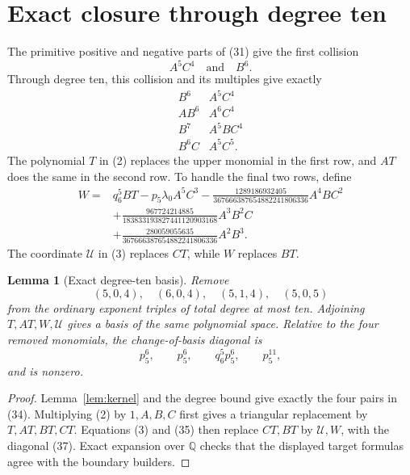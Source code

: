 \documentclass[11pt]{article}
\newtheorem{lemma}[theorem]{Lemma}
\theoremstyle{remark}
\newcommand{\cU}{\mathcal U}
\begin{document}
\section{Exact closure through degree ten}

The primitive positive and negative parts of (31) give the first
collision
\[
A^5C^4\quad\text{and}\quad B^6.
\tag{33}
\]
Through degree ten, this collision and its multiples give exactly
\[
\begin{array}{c|c}
B^6&A^5C^4\\
AB^6&A^6C^4\\
B^7&A^5BC^4\\
B^6C&A^5C^5.
\end{array}
\tag{34}
\]
The polynomial \(T\) in (2) replaces the upper monomial in the first
row, and \(AT\) does the same in the second row.  To handle the final
two rows, define
\[
\begin{aligned}
W={}&q_6^5BT-p_5\lambda_0A^5C^3
-\frac{1289186932405}{367666387654882241806336}A^4BC^2\\
&+\frac{967724214885}{183833193827441120903168}A^3B^2C\\
&+\frac{280059055635}{367666387654882241806336}A^2B^3.
\end{aligned}
\tag{35}
\]
The coordinate \(\cU\) in (3) replaces \(CT\), while \(W\) replaces
\(BT\).

\begin{lemma}[Exact degree-ten basis]
\label{lem:basis-ten}
Remove
\[
(5,0,4),\quad(6,0,4),\quad(5,1,4),\quad(5,0,5)
\tag{36}
\]
from the ordinary exponent triples of total degree at most ten.
Adjoining \(T,AT,W,\cU\) gives a basis of the same polynomial space.
Relative to the four removed monomials, the change-of-basis diagonal is
\[
p_5^6,\qquad p_5^6,\qquad q_6^5p_5^6,\qquad p_5^{11},
\tag{37}
\]
and is nonzero.
\end{lemma}

\begin{proof}
Lemma~\ref{lem:kernel} and the degree bound give exactly the four pairs
in (34).  Multiplying (2) by \(1,A,B,C\) first gives a triangular
replacement by \(T,AT,BT,CT\).  Equations (3) and (35) then replace
\(CT,BT\) by \(\cU,W\), with the diagonal (37).  Exact expansion over
\(\mathbb Q\) checks that the displayed target formulas agree with the
boundary builders.
\end{proof}
\end{document}

